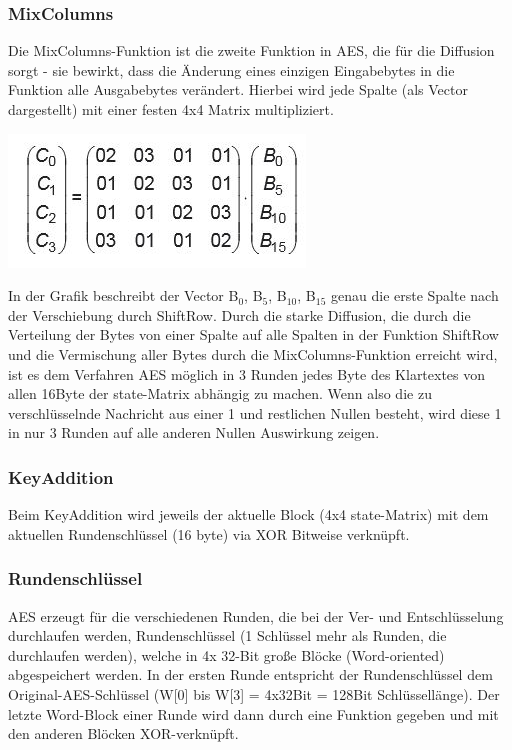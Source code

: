 \documentclass[10pt, a4paper,headsepline]{scrreprt}
\begin{document}
\subsubsection{MixColumns}
Die MixColumns-Funktion ist die zweite Funktion in AES, die für die Diffusion sorgt - sie bewirkt, dass die Änderung eines einzigen Eingabebytes in die Funktion alle Ausgabebytes verändert. Hierbei wird jede Spalte (als Vector dargestellt) mit einer festen 4x4 Matrix multipliziert. 

\includegraphics[scale=0.5]{aes_mixcol.JPG}
\hfill

In der Grafik beschreibt der Vector B$_{0}$, B$_{5}$, B$_{10}$, B$_{15}$ genau die erste Spalte nach der Verschiebung durch ShiftRow. 
Durch die starke Diffusion, die durch die Verteilung der Bytes von einer Spalte auf alle Spalten in der Funktion ShiftRow und die Vermischung aller Bytes durch die MixColumns-Funktion erreicht wird, ist es dem Verfahren AES möglich in 3 Runden jedes Byte des Klartextes von allen 16Byte der state-Matrix abhängig zu machen. Wenn also die zu verschlüsselnde Nachricht aus einer 1 und restlichen Nullen besteht, wird diese 1 in nur 3 Runden auf alle anderen Nullen Auswirkung zeigen.


\subsubsection{KeyAddition}
Beim KeyAddition wird jeweils der aktuelle Block (4x4 state-Matrix) mit dem aktuellen Rundenschlüssel (16 byte) via XOR Bitweise verknüpft. 

\subsubsection{Rundenschlüssel}
AES erzeugt für die verschiedenen Runden, die bei der Ver- und Entschlüsselung durchlaufen werden, Rundenschlüssel (1 Schlüssel mehr als Runden, die durchlaufen werden), welche in 4x 32-Bit große Blöcke (Word-oriented) abgespeichert werden. In der ersten Runde entspricht der Rundenschlüssel dem Original-AES-Schlüssel (W[0] bis W[3] = 4x32Bit = 128Bit Schlüssellänge). Der letzte Word-Block einer Runde wird dann durch eine Funktion gegeben und mit den anderen Blöcken XOR-verknüpft. 
\end{document}

